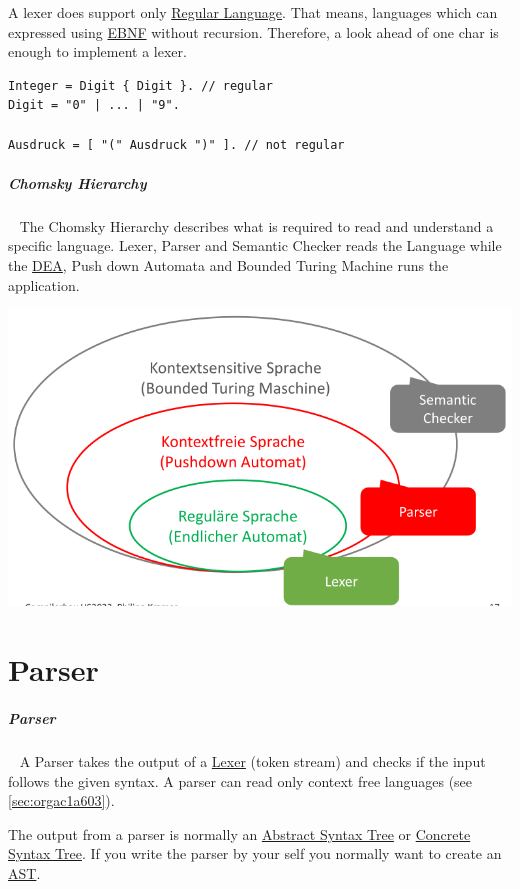 \documentclass[11pt,twoside,landscape]{article}
\begin{document}
\begin{multicols}{3}
A lexer does support only \href{../../../roam/20221228124714-regular_language.org}{Regular Language}.
That means, languages which can expressed using \href{../../../roam/20221228120443-how_do_you_specify_the_syntax_of_a_language.org}{EBNF} without recursion.
Therefore, a look ahead of one char is enough to implement a lexer.

\begin{verbatim}
Integer = Digit { Digit }. // regular
Digit = "0" | ... | "9".

Ausdruck = [ "(" Ausdruck ")" ]. // not regular
\end{verbatim}
\subparagraph{Chomsky Hierarchy} \
\label{sec:orgac1a603}
The Chomsky Hierarchy describes what is required to read and understand a specific language.
Lexer, Parser and Semantic Checker reads the Language while the \href{../../../roam/20211109182310-deterministic_finite_automaton.org}{DEA}, Push down Automata and Bounded Turing Machine runs the application.

{
\begin{center}
\includegraphics[width=.9\linewidth]{img/chomsky_hierarchie.png}
\end{center}
\label{fig:chomsky-hierarchy}
}

\section{Parser}
\label{sec:org62c5c02}
\subparagraph{Parser} \
\label{sec:org798ff97}
A Parser takes the output of a \href{../../../roam/20221228115248-what_is_a_lexer.org}{Lexer} (token stream) and checks if the input follows the given syntax.
A parser can read only context free languages (see \ref{sec:orgac1a603}).

The output from a parser is normally an \href{../../../roam/20221228141024-what_is_a_abstract_syntax_tree.org}{Abstract Syntax Tree} or \href{../../../roam/20221228140533-what_is_a_parse_tree.org}{Concrete Syntax Tree}.
If you write the parser by your self you normally want to create an \href{../../../roam/20221228141024-what_is_a_abstract_syntax_tree.org}{AST}.


\end{multicols}
\end{document}
